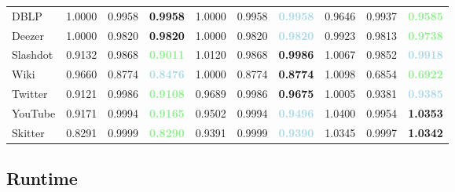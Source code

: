 \begin{table}[h]
\begin{tabular}{l|ccc|ccc|ccc}
DBLP & 1.0000 & 0.9958 & \textbf{\textcolor{lightred}{0.9958}} & 1.0000 & 0.9958 & \textbf{\textcolor{lightblue}{0.9958}} & 0.9646 & 0.9937 & \textbf{\textcolor{lightgreen}{0.9585}} \\
Deezer & 1.0000 & 0.9820 & \textbf{\textcolor{lightred}{0.9820}} & 1.0000 & 0.9820 & \textbf{\textcolor{lightblue}{0.9820}} & 0.9923 & 0.9813 & \textbf{\textcolor{lightgreen}{0.9738}} \\
Slashdot & 0.9132 & 0.9868 & \textbf{\textcolor{lightgreen}{0.9011}} & 1.0120 & 0.9868 & \textbf{\textcolor{lightred}{0.9986}} & 1.0067 & 0.9852 & \textbf{\textcolor{lightblue}{0.9918}} \\
Wiki & 0.9660 & 0.8774 & \textbf{\textcolor{lightblue}{0.8476}} & 1.0000 & 0.8774 & \textbf{\textcolor{lightred}{0.8774}} & 1.0098 & 0.6854 & \textbf{\textcolor{lightgreen}{0.6922}} \\
Twitter & 0.9121 & 0.9986 & \textbf{\textcolor{lightgreen}{0.9108}} & 0.9689 & 0.9986 & \textbf{\textcolor{lightred}{0.9675}} & 1.0005 & 0.9381 & \textbf{\textcolor{lightblue}{0.9385}} \\
YouTube & 0.9171 & 0.9994 & \textbf{\textcolor{lightgreen}{0.9165}} & 0.9502 & 0.9994 & \textbf{\textcolor{lightblue}{0.9496}} & 1.0400 & 0.9954 & \textbf{\textcolor{lightred}{1.0353}} \\
Skitter & 0.8291 & 0.9999 & \textbf{\textcolor{lightgreen}{0.8290}} & 0.9391 & 0.9999 & \textbf{\textcolor{lightblue}{0.9390}} & 1.0345 & 0.9997 & \textbf{\textcolor{lightred}{1.0342}} \\
\midrule
\bottomrule
\end{tabular}

\end{table}

\subsection{Runtime}

